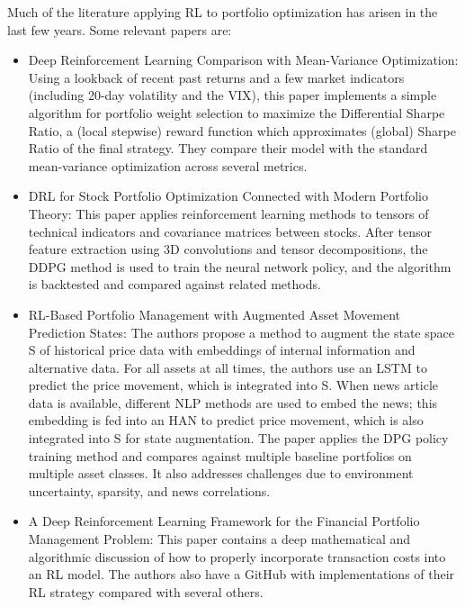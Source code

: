Much of the literature applying RL to portfolio optimization has arisen in the 
last few years. Some relevant papers are:

\begin{itemize}

\item \cite{drl_mvo} Deep Reinforcement Learning Comparison with Mean-Variance Optimization: 
Using a lookback of recent past returns and a few market indicators 
(including 20-day volatility and the VIX), this paper implements a simple 
algorithm for portfolio weight selection to maximize the Differential Sharpe Ratio, 
a (local stepwise) reward function which approximates (global) Sharpe Ratio of the 
final strategy. They compare their model with the standard mean-variance 
optimization across several metrics.

\item \cite{drl_modern_portfolio_theory} DRL for Stock Portfolio Optimization Connected with Modern 
Portfolio Theory: This paper applies reinforcement learning methods to 
tensors of technical indicators and covariance matrices between stocks. 
After tensor feature extraction using 3D convolutions and tensor decompositions, 
the DDPG method is used to train the neural network policy, and the algorithm 
is backtested and compared against related methods.
 
\item \cite{rl_augmented_states} RL-Based Portfolio Management with Augmented Asset Movement Prediction 
States: The authors propose a method to augment the state space S of historical 
price data with embeddings of internal information and alternative data. 
For all assets at all times, the authors use an LSTM to predict the price movement,
which is integrated into S. When news article data is available, different NLP methods 
are used to embed the news; this embedding is fed into an HAN to predict price 
movement, which is also integrated into S for state augmentation. The paper applies 
the DPG policy training method and compares against multiple baseline portfolios on 
multiple asset classes. It also addresses challenges due to environment uncertainty, 
sparsity, and news correlations.

\item \cite{drl_framework} A Deep Reinforcement Learning Framework for the Financial Portfolio Management Problem: 
This paper contains a deep mathematical and algorithmic discussion of how to properly incorporate 
transaction costs into an RL model. The authors also have a GitHub with implementations of their 
RL strategy compared with several others.


\end{itemize}
